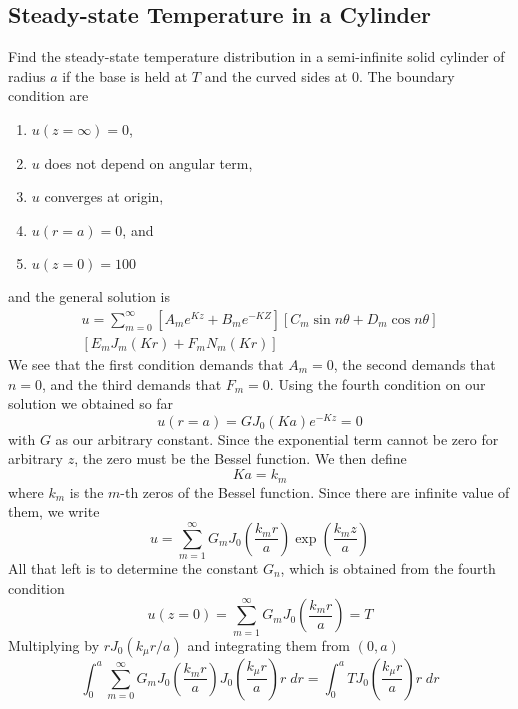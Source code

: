 \documentclass[../../main.tex]{subfiles}
\begin{document}
\subsection*{Steady-state Temperature in a Cylinder}
Find the steady-state temperature distribution in a semi-infinite solid cylinder of radius $a$ if the base is held at $T$ and the curved sides at 0\textdegree. The boundary condition are 
\begin{enumerate}
  \item $u(z=\infty)=0$,
  \item $u$ does not depend on angular term,
  \item $u$ converges at origin,
  \item $u(r=a)=0$, and
  \item $u(z=0)=100$
\end{enumerate}
and the general solution is 
\begin{multline*}
  u=\sum_{m=0}^{\infty}\left[A_me^{Kz}+B_me^{-KZ}\right]\left[C_m\sin n\theta +D_m\cos n\theta\right]\\
  \left[E_mJ_m(Kr)+F_mN_m(Kr)\right]
\end{multline*}
We see that the first condition demands that $A_m=0$, the second demands that $n=0$, and the third demands that $F_m=0$. Using the fourth condition on our solution we obtained so far
\begin{equation*}
  u(r=a)=GJ_0(Ka)e^{-Kz}=0
\end{equation*}
with $G$ as our arbitrary constant. Since the exponential term cannot be zero for arbitrary $z$, the zero must be the Bessel function. We then define 
\begin{equation*}
  Ka=k_m
\end{equation*}
where $k_m$ is the $m$-th zeros of the Bessel function. Since there are infinite value of them, we write 
\begin{equation*}
  u=\sum_{m=1}^{\infty}G_mJ_0\left(\frac{k_mr}{a}\right)\exp\left(\frac{k_mz}{a}\right)
\end{equation*}
All that left is to determine the constant $G_n$, which is obtained from the fourth condition
\begin{equation*}
  u(z=0)=\sum_{m=1}^{\infty}G_mJ_0\left(\frac{k_mr}{a}\right)=T
\end{equation*} 
Multiplying by $rJ_0(k_\mu r/a)$ and integrating them from $(0,a)$
\begin{equation*}
  \int_{0}^{a}\sum_{m=0}^{\infty}G_mJ_0\left(\frac{k_mr}{a}\right)J_0\left(\frac{k_\mu r}{a}\right)r\;dr=\int_{0}^{a}TJ_0\left(\frac{k_\mu r}{a}\right)r\;dr
\end{equation*}
\end{document}
